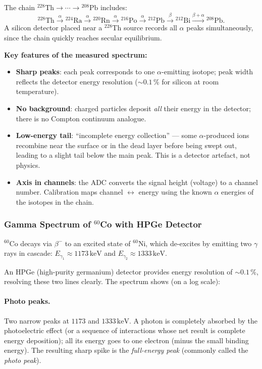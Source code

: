 The chain ${}^{228}\text{Th} \to \cdots \to {}^{208}\text{Pb}$ includes:
\begin{equation*}
  {}^{228}\text{Th} \xrightarrow{\alpha}
  {}^{224}\text{Ra} \xrightarrow{\alpha}
  {}^{220}\text{Rn} \xrightarrow{\alpha}
  {}^{216}\text{Po} \xrightarrow{\alpha}
  {}^{212}\text{Pb} \xrightarrow{\beta}
  {}^{212}\text{Bi} \xrightarrow{\beta+\alpha}
  {}^{208}\text{Pb}.
\end{equation*}
A silicon detector placed near a $^{228}$Th source records all $\alpha$ peaks
simultaneously, since the chain quickly reaches secular equilibrium.

\textbf{Key features of the measured spectrum:}
\begin{itemize}
  \item \textbf{Sharp peaks}: each peak corresponds to one $\alpha$-emitting
  isotope; peak width reflects the detector energy resolution ($\sim 0.1\,\%$
  for silicon at room temperature).
  \item \textbf{No background}: charged particles deposit \emph{all} their
  energy in the detector; there is no Compton continuum analogue.
  \item \textbf{Low-energy tail}: ``incomplete energy collection'' — some
  $\alpha$-produced ions recombine near the surface or in the dead layer before
  being swept out, leading to a slight tail below the main peak.
  This is a detector artefact, not physics.
  \item \textbf{Axis in channels}: the ADC converts the signal height (voltage)
  to a channel number.  Calibration maps channel $\leftrightarrow$ energy using
  the known $\alpha$ energies of the isotopes in the chain.
\end{itemize}

\subsubsection*{Gamma Spectrum of $^{60}$Co with HPGe Detector}

$^{60}$Co decays via $\beta^-$ to an excited state of $^{60}$Ni, which
de-excites by emitting two $\gamma$ rays in cascade:
$E_{\gamma_1} \approx 1173\,\text{keV}$ and $E_{\gamma_2} \approx 1333\,\text{keV}$.

An HPGe (high-purity germanium) detector provides energy resolution of
$\sim 0.1\,\%$, resolving these two lines clearly.  The spectrum shows
(on a log scale):

\paragraph{Photo peaks.}
Two narrow peaks at $1173$ and $1333\,\text{keV}$.  A photon is completely
absorbed by the photoelectric effect (or a sequence of interactions whose net
result is complete energy deposition); all its energy goes to one electron
(minus the small binding energy).  The resulting sharp spike is the
\emph{full-energy peak} (commonly called the \emph{photo peak}).


